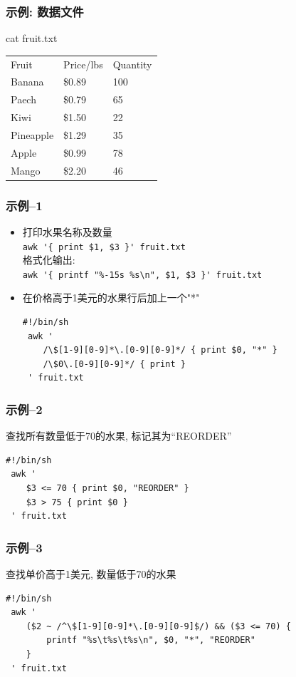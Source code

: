 \documentclass[compress]{beamer}
\begin{document}
\begin{frame}
\frametitle{示例: 数据文件}

{cat fruit.txt}\\[1ex]
\begin{tabular}{p{2cm}p{3cm}l}
Fruit & Price/lbs & Quantity\\
Banana & \$0.89 & 100\\
Paech & \$0.79 & 65\\
Kiwi & \$1.50 & 22\\
Pineapple & \$1.29 & 35\\
Apple & \$0.99 & 78\\
Mango & \$2.20 & 46\\
\end{tabular}


\end{frame}

\begin{frame}[fragile]
\frametitle{示例--1}

\begin{itemize}
\item 打印水果名称及数量\\
  {\small \verb~awk '{ print $1, $3 }' fruit.txt~}\\
格式化输出:\\
{\small \verb~awk '{ printf "%-15s %s\n", $1, $3 }' fruit.txt~}

\item 在价格高于1美元的水果行后加上一个"*"\\
\begin{lstlisting}
#!/bin/sh
 awk '
    /\$[1-9][0-9]*\.[0-9][0-9]*/ { print $0, "*" }
    /\$0\.[0-9][0-9]*/ { print }
 ' fruit.txt
\end{lstlisting}
\end{itemize}
\end{frame}

\begin{frame}[fragile]
\frametitle{示例--2}

查找所有数量低于70的水果, 标记其为``REORDER''\\
\begin{lstlisting}
#!/bin/sh
 awk '
    $3 <= 70 { print $0, "REORDER" }
    $3 > 75 { print $0 }
 ' fruit.txt
\end{lstlisting}

\end{frame}


\begin{frame}[fragile]
\frametitle{示例--3}

查找单价高于1美元, 数量低于70的水果 \\
\begin{lstlisting}
#!/bin/sh
 awk '
    ($2 ~ /^\$[1-9][0-9]*\.[0-9][0-9]$/) && ($3 <= 70) {
        printf "%s\t%s\t%s\n", $0, "*", "REORDER"
    }
 ' fruit.txt
 \end{lstlisting}

\end{frame}
\end{document}
